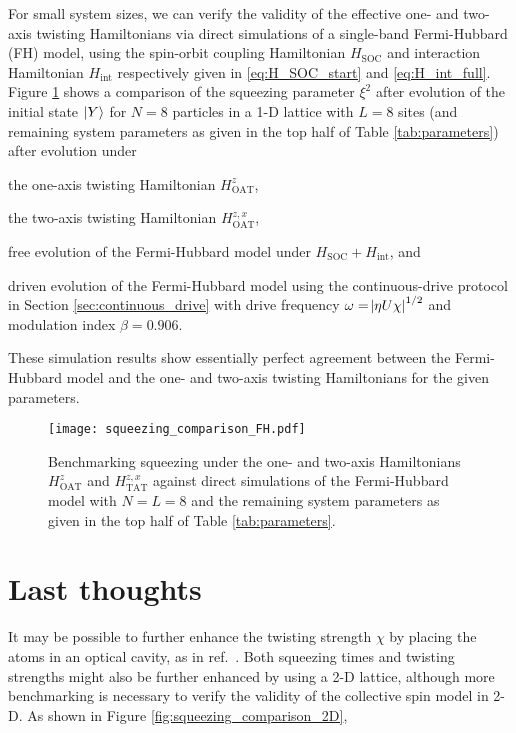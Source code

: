 \documentclass[aps,notitlepage,nofootinbib,11pt]{revtex4-1}
\renewcommand{\t}{\text} %
\newcommand{\1}{\mathds{1}}
\begin{document}
For small system sizes, we can verify the validity of the effective
one- and two-axis twisting Hamiltonians via direct simulations of a
single-band Fermi-Hubbard (FH) model, using the spin-orbit coupling
Hamiltonian $H_{\t{SOC}}$ and interaction Hamiltonian $H_{\t{int}}$
respectively given in \eqref{eq:H_SOC_start} and
\eqref{eq:H_int_full}.  Figure \ref{fig:squeezing_comparison_FH} shows
a comparison of the squeezing parameter $\xi^2$ after evolution of the
initial state $\ket{Y}$ for $N=8$ particles in a 1-D lattice with
$L=8$ sites (and remaining system parameters as given in the top half
of Table \ref{tab:parameters}) after evolution under
\begin{enumerate*}[label=(\roman*)]
\item the one-axis twisting Hamiltonian $H_{\t{OAT}}^z$,
\item the two-axis twisting Hamiltonian $H_{\t{OAT}}^{z,x}$,
\item free evolution of the Fermi-Hubbard model under
  $H_{\t{SOC}}+H_{\t{int}}$, and
\item driven evolution of the Fermi-Hubbard model using the
  continuous-drive protocol in Section \ref{sec:continuous_drive} with
  drive frequency $\omega=\abs{\eta U\chi}^{1/2}$ and modulation index
  $\beta=0.906$.
\end{enumerate*}
These simulation results show essentially perfect agreement between
the Fermi-Hubbard model and the one- and two-axis twisting
Hamiltonians for the given parameters.

\begin{figure}
  \centering
  \texttt{[image: squeezing\_comparison\_FH.pdf]}
  \caption{Benchmarking squeezing under the one- and two-axis
    Hamiltonians $H_{\t{OAT}}^z$ and $H_{\t{TAT}}^{z,x}$ against
    direct simulations of the Fermi-Hubbard model with $N=L=8$ and the
    remaining system parameters as given in the top half of Table
    \ref{tab:parameters}.}
  \label{fig:squeezing_comparison_FH}
\end{figure}


\section{Last thoughts}

It may be possible to further enhance the twisting strength $\chi$ by
placing the atoms in an optical cavity, as in
ref.~\cite{hu2017vacuum}.  Both squeezing times and twisting strengths
might also be further enhanced by using a 2-D lattice, although more
benchmarking is necessary to verify the validity of the collective
spin model in 2-D.  As shown in Figure
\ref{fig:squeezing_comparison_2D},
\end{document}
